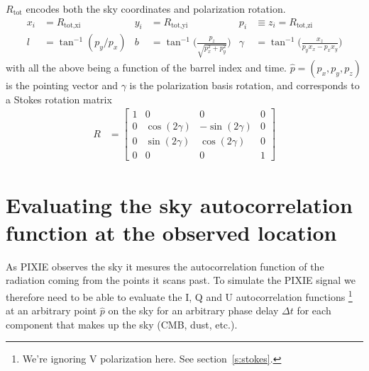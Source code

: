 \documentclass{article}
\begin{document}
$R_\textrm{tot}$ encodes both the sky coordinates and polarization rotation.
\begin{align}
	x_i &= R_\textrm{tot,xi} & y_i &= R_\textrm{tot,yi} & p_i &\equiv z_i = R_\textrm{tot,zi} \\
	l        &= \tan^{-1}(p_y/p_x)  &
	b        &= \tan^{-1}\Big(\frac{p_z}{\sqrt{p_x^2+p_y^2}}\Big) &
	\gamma   &= \tan^{-1}\Big(\frac{x_z}{p_y x_x - p_x x_y}\Big)
\end{align}
with all the above being a function of the barrel index and time.
$\hat p = (p_x,p_y,p_z)$ is the pointing vector and $\gamma$ is the
polarization basis rotation, and corresponds to a Stokes rotation
matrix
\begin{align}
	R &= \begin{bmatrix}
		1 & 0 & 0 & 0\\
		0 & \cos(2\gamma) & -\sin(2\gamma) & 0\\
		0 & \sin(2\gamma) & \cos(2\gamma) & 0 \\
		0 & 0 & 0 & 1
	\end{bmatrix}
\end{align}


\section{Evaluating the sky autocorrelation function at the observed location}
As PIXIE observes the sky it mesures the autocorrelation function of the
radiation coming from the points it scans past. To simulate the PIXIE signal
we therefore need to be able to evaluate the I, Q and U autocorrelation
functions
\footnote{We're ignoring V polarization here. See section~\ref{s:stokes}.}
at an arbitrary point $\hat p$ on the sky for an arbitrary phase
delay $\Delta t$ for each component that makes up the sky (CMB, dust, etc.).
\end{document}
